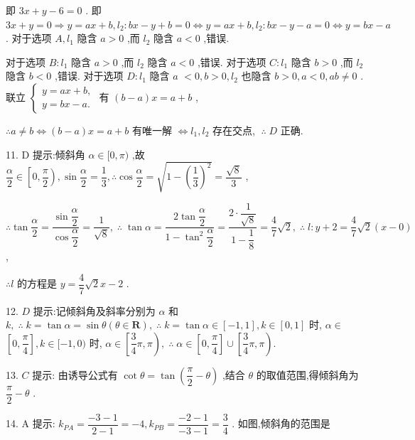 即 ${3x} + y - 6 = 0$ . 即 ${3x} + y = 0 \Rightarrow  y = {ax} + b,{l}_{2} : {bx} - y + b = 0 \Leftrightarrow  y = {ax} + b,{l}_{2} : {bx} - y - a = 0 \Leftrightarrow  y = {bx} - a$ . 对于选项 $A,{l}_{1}$ 隐含 $a > 0$ ,而 ${l}_{2}$ 隐含 $a < 0$ ,错误.

对于选项 $B : {l}_{1}$ 隐含 $a > 0$ ,而 ${l}_{2}$ 隐含 $a < 0$ ,错误. 对于选项 $C : {l}_{1}$ 隐含 $b > 0$ ,而 ${l}_{2}$ 隐含 $b < 0$ ,错误. 对于选项 $D : {l}_{1}$ 隐含 $a$  $< 0,b > 0,{l}_{2}$ 也隐含 $b > 0,a < 0,{ab} \neq  0$ . 联立 $\left\{  \begin{array}{l} y = {ax} + b, \\  y = {bx} - a. \end{array}\right.$ 有 $\left( {b - a}\right) x = a + b$ ,

$\therefore a \neq  b \Leftrightarrow  \left( {b - a}\right) x = a + b$ 有唯一解 $\Leftrightarrow  {l}_{1},{l}_{2}$ 存在交点, $\;\therefore \;D$ 正确.

11. D 提示:倾斜角 $\alpha  \in  \lbrack 0,\pi )$ ,故 $\dfrac{\alpha }{2} \in  \left\lbrack  {0,\dfrac{\pi }{2}}\right) ,\sin \dfrac{\alpha }{2} = \dfrac{1}{3},\therefore \cos \dfrac{\alpha }{2} = \sqrt{1 - {\left( \dfrac{1}{3}\right) }^{2}} = \dfrac{\sqrt{8}}{3}$ ,

$\therefore \tan \dfrac{\alpha }{2} = \dfrac{\sin \dfrac{\alpha }{2}}{\cos \dfrac{\alpha }{2}} = \dfrac{1}{\sqrt{8}},\;\therefore \;\tan \alpha  = \dfrac{2\tan \dfrac{\alpha }{2}}{1 - {\tan }^{2}\dfrac{\alpha }{2}} = \dfrac{2 \cdot  \dfrac{1}{\sqrt{8}}}{1 - \dfrac{1}{8}} = \dfrac{4}{7}\sqrt{2},\;\therefore \;l : y + 2 = \dfrac{4}{7}\sqrt{2}\left( {x - 0}\right)$ ,

$\therefore l$ 的方程是 $y = \dfrac{4}{7}\sqrt{2}x - 2$ .

12. $D$ 提示:记倾斜角及斜率分别为 $\alpha$ 和 $k,\;\therefore \;k = \tan \alpha  = \sin \theta \left( {\theta  \in  \mathbf{R}}\right) ,\;\therefore \;k = \tan \alpha  \in  \left\lbrack  {-1,1}\right\rbrack  ,k \in  \left\lbrack  {0,1}\right\rbrack$ 时, $\alpha  \in$  $\left\lbrack  {0,\dfrac{\pi }{4}}\right\rbrack  ,k \in  \lbrack  - 1,0)$ 时, $\alpha  \in  \left\lbrack  {\dfrac{3}{4}\pi ,\pi }\right) ,\;\therefore \;\alpha  \in  \left\lbrack  {0,\dfrac{\pi }{4}}\right\rbrack   \cup  \left\lbrack  {\dfrac{3}{4}\pi ,\pi }\right) .$

13. $C$ 提示: 由诱导公式有 $\cot \theta  = \tan \left( {\dfrac{\pi }{2} - \theta }\right)$ ,结合 $\theta$ 的取值范围,得倾斜角为 $\dfrac{\pi }{2} - \theta$ .

14. A 提示: ${k}_{PA} = \dfrac{-3 - 1}{2 - 1} =  - 4,{k}_{PB} = \dfrac{-2 - 1}{-3 - 1} = \dfrac{3}{4}$ . 如图,倾斜角的范围是

